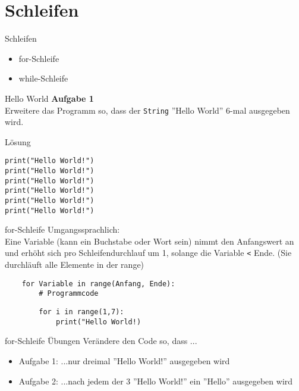 \section{Schleifen}

\begin{frame}{Schleifen}
\begin{itemize}
	\item for-Schleife
	\item while-Schleife
\end{itemize}
\end{frame}


\begin{frame}[fragile]{Hello World}
\textbf{Aufgabe 1}\\
	Erweitere das Programm so, dass  der \texttt{String} ''Hello World''
	6-mal ausgegeben wird.

\pause{}
\begin{exampleblock}{Lösung}
	\begin{lstlisting}
print("Hello World!")
print("Hello World!")
print("Hello World!")
print("Hello World!")
print("Hello World!")
print("Hello World!")
	\end{lstlisting}
\end{exampleblock}
\end{frame}


\begin{frame}[fragile]{for-Schleife}
	Umgangssprachlich: \\
	Eine Variable (kann ein Buchstabe oder Wort sein) nimmt den Anfangswert an und erhöht sich pro Schleifendurchlauf um 1, solange die Variable \texttt{<} Ende. (Sie durchläuft alle Elemente in der range)
	
	\begin{lstlisting}
	for Variable in range(Anfang, Ende):
		# Programmcode
	\end{lstlisting}
	
	\begin{lstlisting}
		for i in range(1,7):
			print("Hello World!)
	\end{lstlisting}	
\end{frame}

\begin{frame}[fragile]{for-Schleife Übungen}
Verändere den Code so, dass ...
\begin{itemize}
\item Aufgabe 1: ...nur dreimal ''Hello World!'' ausgegeben wird\\
\item Aufgabe 2: ...nach jedem der 3 ''Hello World!'' ein ''Hello'' ausgegeben wird
\end{itemize}
\end{frame}


